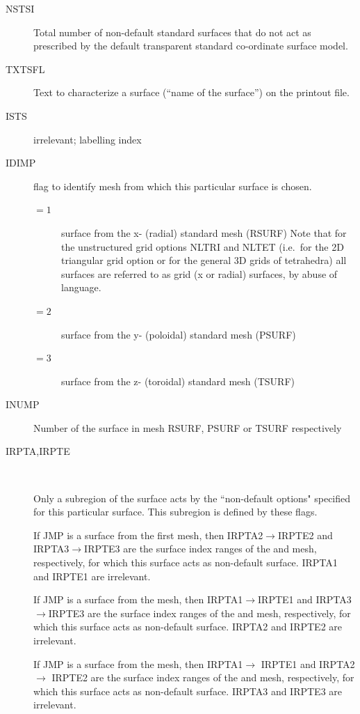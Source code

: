 \medskip 

\begin{description}
  \item[NSTSI] Total number of non-default standard surfaces
        that do not act as prescribed by the default transparent standard co-ordinate
        surface model.
  \item[TXTSFL] Text to characterize a surface (``name of the surface'') on the
        printout file.
  \item[ISTS] irrelevant; labelling index
  \item[IDIMP] flag to identify mesh from
        which this particular surface is chosen.
        \begin{description}
          \item[$= 1$] surface from the x- (radial) standard mesh (RSURF) Note that for
                the unstructured grid options NLTRI and NLTET (i.e.\ for the 2D triangular grid
                option or for the general 3D grids of tetrahedra) all surfaces are referred to
                as  grid (x or radial) surfaces, by abuse of language.
          \item[$= 2$] surface from the y- (poloidal) standard mesh (PSURF)
          \item[$= 3$]
                surface from the z- (toroidal) standard mesh (TSURF)
        \end{description}
  \item[INUMP] Number of the surface in mesh RSURF, PSURF or TSURF respectively
  \item[IRPTA,IRPTE] ~ 

        Only a subregion of the surface acts by the ``non-default options" specified
        for this particular surface.
        This subregion is defined by these flags.

        If JMP is a surface from the first mesh, then IRPTA2$\rightarrow $IRPTE2 and
        IRPTA3$\rightarrow $IRPTE3 are the surface index ranges of the 
        and  mesh, respectively, for which this surface acts as
        non-default surface.
        IRPTA1 and IRPTE1 are irrelevant.

        If JMP is a surface from the  mesh, then IRPTA1$\rightarrow
        $IRPTE1 and IRPTA3$\rightarrow $IRPTE3 are the surface index ranges of the
         and  mesh, respectively, for which this surface
        acts as non-default surface.
        IRPTA2 and IRPTE2 are irrelevant.

        If JMP is a surface from the  mesh, then IRPTA1$\rightarrow$
        IRPTE1 and IRPTA2$\rightarrow$ IRPTE2 are the surface index ranges of the
         and  mesh, respectively, for which this surface
        acts as non-default surface.
        IRPTA3 and IRPTE3 are irrelevant.
\end{description}

